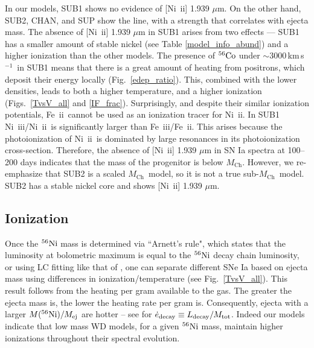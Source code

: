 \documentclass[useAMS,usenatbib,useasmath]{mnras}
\newcommand{\Mch}{\hbox{$M_{\text{Ch}}$}}
\newcommand{\kms}{\hbox{km$\,$s$^{-1}$}}
\newcommand{\elem}[2][default]{$^{#1}{\rm #2}$}
\newcommand{\feii}{\mbox{Fe~{\sc ii}}}
\newcommand{\feiii}{\mbox{Fe~{\sc iii}}}
\newcommand{\nkii}{\mbox{Ni~{\sc ii}}}
\newcommand{\nkiii}{\mbox{Ni~{\sc iii}}}
\def\fig{Fig.}
\def\figs{Figs.}
\begin{document}
In our models, SUB1 shows no evidence of [\nkii] 1.939 $\mu$m. On the other hand, SUB2, CHAN, and SUP show the line, with a strength that correlates with ejecta mass. The absence of [\nkii] 1.939 $\mu$m in SUB1 arises from two effects --- SUB1 has a smaller amount of stable nickel (see Table \ref{model_info_abund}) and a higher ionization than the other models. The presence of \elem[56]{Co} under $\sim$3000\,\kms\ in SUB1 means that there is a great amount of heating from positrons, which deposit their energy locally (\fig~\ref{edep_ratio}). This, combined with the lower densities, leads to both a higher temperature, and a higher ionization (\figs~\ref{TvsV_all} and \ref{IF_frac}). Surprisingly, and despite their similar ionization potentials, \feii\ cannot be used as an ionization tracer for \nkii. In SUB1 \nkiii/\nkii\ is significantly larger than \feiii/\feii. This arises because the photoionization of \nkii\ is dominated by large resonances in its photoionization cross-section. Therefore, the absence of [\nkii] 1.939 $\mu$m in SN Ia spectra at 100--200 days indicates that the mass of the progenitor is below \Mch. However, we re-emphasize that SUB2 is a scaled \Mch\ model, so it is not a true sub-\Mch\ model. SUB2 has a stable nickel core and shows [\nkii] 1.939 $\mu$m.

\subsection{Ionization}%
Once the \elem[56]{Ni} mass is determined via ``Arnett's rule", which states that the luminosity at bolometric maximum is equal to the \elem[56]{Ni} decay chain luminosity, or using LC fitting like that of \cite{Scalzo2014a,Scalzo2014b}, one can separate different SNe Ia based on ejecta mass using differences in ionization/temperature (see \fig~\ref{TvsV_all}). This result follows from the heating per gram available to the gas. The greater the ejecta mass is, the lower the heating rate per gram is. Consequently, ejecta with a larger $M(^{56}{\rm Ni})/M_{\rm ej}$ are hotter -- see \cite{Blondin2017} for $\dot{e}_{\rm decay}\equiv L_{\rm decay}/M_{\rm tot}$. Indeed our models indicate that low mass WD models, for a given \elem[56]{Ni} mass, maintain higher ionizations throughout their spectral evolution. 
\end{document}
